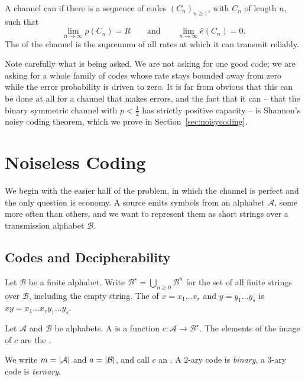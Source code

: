 \documentclass[a4paper]{scrartcl}
\newcommand{\Ac}{\mathcal{A}}
\newcommand{\Bc}{\mathcal{B}}
\begin{document}
\begin{definition}[Capacity]
	A channel can  if there is a sequence of codes $(C_n)_{n \ge 1}$, with $C_n$ of length $n$, such that
	$$\lim_{n \to \infty} \rho(C_n) = R \qquad \text{and} \qquad \lim_{n \to \infty} \hat e(C_n) = 0.$$
	The  of the channel is the supremum of all rates at which it can transmit reliably.
\end{definition}

Note carefully what is being asked. We are not asking for one good code; we are asking for a whole family of codes whose rate stays bounded away from zero while the error probability is driven to zero. It is far from obvious that this can be done at all for a channel that makes errors, and the fact that it can -- that the binary symmetric channel with $p< \tfrac12$ has strictly positive capacity -- is Shannon's noisy coding theorem, which we prove in Section~\ref{sec:noisycoding}.

\section{Noiseless Coding}

We begin with the easier half of the problem, in which the channel is perfect and the only question is economy. A source emits symbols from an alphabet $\Ac$, some more often than others, and we want to represent them as short strings over a transmission alphabet $\Bc$.

\subsection{Codes and Decipherability}

Let $\Bc$ be a finite alphabet. Write $\Bc^\star = \bigcup_{n \ge 0} \Bc^n$ for the set of all finite strings over $\Bc$, including the empty string. The  of $x = x_1 \dots x_r$ and $y = y_1 \dots y_s$ is $xy = x_1 \dots x_r y_1 \dots y_s$.

\begin{definition}[Code]
	Let $\Ac$ and $\Bc$ be alphabets. A  is a function $c \colon \Ac \to \Bc^\star$. The elements of the image of $c$ are the .
\end{definition}

We write $m = \abs{\Ac}$ and $a = \abs{\Bc}$, and call $c$ an . A $2$-ary code is \emph{binary}, a $3$-ary code is \emph{ternary}.
\end{document}
